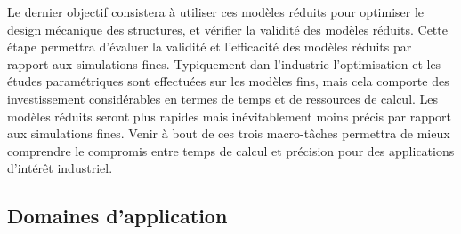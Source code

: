 \documentclass[french]{article}
\begin{document}
Le dernier objectif consistera à utiliser ces modèles réduits pour optimiser le design
mécanique des structures, et vérifier la validité des modèles réduits. Cette étape permettra
d’évaluer la validité et l’efficacité des modèles réduits par rapport aux simulations fines.
Typiquement dan l'industrie l’optimisation et les études paramétriques sont effectuées sur les
modèles fins, mais cela comporte des investissement considérables en termes de temps et de
ressources de calcul. Les modèles réduits seront plus rapides mais inévitablement
moins précis par rapport aux simulations fines. Venir à bout de ces trois macro-tâches
permettra de mieux comprendre le compromis entre temps de calcul et précision pour des
applications d’intérêt industriel. 

\subsection{Domaines d'application}
\end{document}
